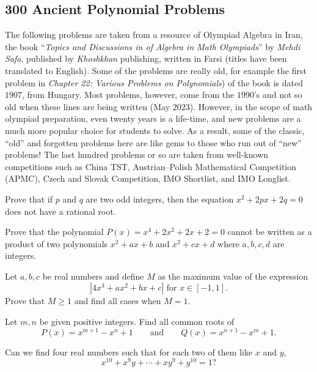 \documentclass[12pt,a4paper]{memoir}
\theoremstyle{definition}
\begin{document}
\subsection{300 Ancient Polynomial Problems}
The following problems are taken from a resource of Olympiad Algebra in Iran, the book ``\textit{Topics and Discussions in of Algebra in Math Olympiads}'' by \textit{Mehdi Safa}, published by \textit{Khoshkhan} publishing, written in Farsi (titles have been translated to English). Some of the problems are really old, for example the first problem in \textit{Chapter 22: Various Problems on Polynomials}) of the book is dated $1907$, from Hungary. Most problems, however, come from the $1990$'s and not so old when these lines are being written (May $2023$). However, in the scope of math olympiad preparation, even twenty years is a life-time, and new problems are a much more popular choice for students to solve. As a result, some of the classic, ``old'' and forgotten problems here are like gems to those who run out of ``new'' problems! The last hundred problems or so are taken from well-known competitions such as China TST, Austrian--Polish Mathematical Competition (APMC), Czech and Slovak Competition, IMO Shortlist, and IMO Longlist.


\begin{question}[name={1907 Hungary}]
	Prove that if $p$ and $q$ are two odd integers, then the equation $x^2+2px+2q=0$ does not have a rational root.
\end{question}


\begin{question}[name={1907 Hungary}]
	Prove that the polynomial $P(x)=x^4+2x^2+2x+2=0$ cannot be written as a product of two polynomials $x^2+ax+b$ and $x^2+cx+d$ where $a,b,c,d$ are integers.
\end{question}


\begin{question}[name={1996 Bulgaria}]
	Let $a,b,c$ be real numbers and define $M$ as the maximum value of the expression
	\[|4x^3+ax^2+bx+c| \text{ for } x\in [-1,1].\]
	Prove that $M\geq 1$ and find all cases when $M=1$.
\end{question}


\begin{question}[name={1994 Romania}]
	Let $m,n$ be given positive integers. Find all common roots of
	\[P(x)=x^{m+1}-x^n+1 \qquad \text{and} \qquad Q(x)=x^{n+1}-x^m+1.\]
\end{question}


\begin{question}[name={1990 Iran}]
	Can we find four real numbers such that for each two of them like $x$ and $y$,
	\[x^{10} + x^9y + \cdots + xy^9 + y^{10} = 1?\]
\end{question}
\end{document}
